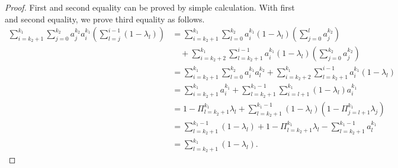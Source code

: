 \documentclass{article} %
\newcommand*{\para}[1]{\left({#1}\right)}
\begin{document}
\begin{proof}
    First and second equality can be proved by simple calculation. With first and second equality, we prove third equality as follows.
    \begin{align*}
        \sum^{k_1}_{i=k_2+1}\sum^{k_2}_{j=0} a^{k_2}_j  a^{k_1}_i \para{ \sum^{i-1}_{l=j} (1-\lambda_{l})}& =        \sum^{k_1}_{i=k_2+1}\sum^{k_2}_{l=0}  a^{k_1}_i (1-\lambda_{l})\para{ \sum^{l}_{j=0} a^{k_2}_j}
        \\& \quad+        \sum^{k_1}_{i=k_2+2}\sum^{i-1}_{l=k_2+1}  a^{k_1}_i (1-\lambda_{l})\para{ \sum^{k_2}_{j=0} a^{k_2}_j}
        \\& = \sum^{k_1}_{i=k_2+1}\sum^{k_2}_{l=0}  a^{k_1}_i a^{k_2}_l+\sum^{k_1}_{i=k_2+2}\sum^{i-1}_{l=k_2+1}  a^{k_1}_i (1-\lambda_{l})
        \\& = \sum^{k_1}_{i=k_2+1}  a^{k_1}_i+\sum^{k_1-1}_{l=k_2+1}  \sum^{k_1}_{i=l+1}(1-\lambda_{l}) a^{k_1}_i
        \\& =1-\Pi^{k_1}_{l=k_2+1}\lambda_{l}+\sum^{k_1-1}_{l=k_2+1}  (1-\lambda_{l})(1-\Pi^{k_1}_{j=l+1}\lambda_{j})
        \\& =\sum^{k_1-1}_{l=k_2+1}  (1-\lambda_{l})+1-\Pi^{k_1}_{l=k_2+1}\lambda_{l}-\sum^{k_1-1}_{l=k_2+1}  a^{k_1}_l
         \\& =\sum^{k_1}_{l=k_2+1}  (1-\lambda_{l}).
    \end{align*}
\end{proof}
\end{document}
